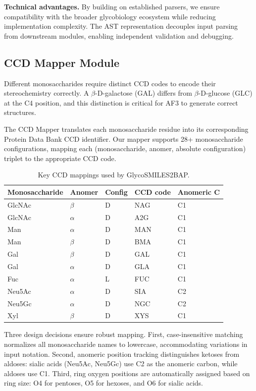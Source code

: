 \documentclass[11pt,a4paper]{article}
\begin{document}
\textbf{Technical advantages.} By building on established parsers, we ensure compatibility with the broader glycobiology ecosystem while reducing implementation complexity. The AST representation decouples input parsing from downstream modules, enabling independent validation and debugging.

\subsection{CCD Mapper Module}

Different monosaccharides require distinct CCD codes to encode their stereochemistry correctly. A $\beta$-D-galactose (GAL) differs from $\beta$-D-glucose (GLC) at the C4 position, and this distinction is critical for AF3 to generate correct structures.

The CCD Mapper translates each monosaccharide residue into its corresponding Protein Data Bank CCD identifier. Our mapper supports 28+ monosaccharide configurations, mapping each (monosaccharide, anomer, absolute configuration) triplet to the appropriate CCD code.

\begin{table}[htbp]
\centering
\caption{Key CCD mappings used by GlycoSMILES2BAP.}
\begin{tabular}{lllll}
\toprule
Monosaccharide & Anomer & Config & CCD code & Anomeric C \\
\midrule
GlcNAc & $\beta$ & D & NAG & C1 \\
GlcNAc & $\alpha$ & D & A2G & C1 \\
Man & $\alpha$ & D & MAN & C1 \\
Man & $\beta$ & D & BMA & C1 \\
Gal & $\beta$ & D & GAL & C1 \\
Gal & $\alpha$ & D & GLA & C1 \\
Fuc & $\alpha$ & L & FUC & C1 \\
Neu5Ac & $\alpha$ & D & SIA & C2 \\
Neu5Gc & $\alpha$ & D & NGC & C2 \\
Xyl & $\beta$ & D & XYS & C1 \\
\bottomrule
\end{tabular}
\end{table}

Three design decisions ensure robust mapping. First, case-insensitive matching normalizes all monosaccharide names to lowercase, accommodating variations in input notation. Second, anomeric position tracking distinguishes ketoses from aldoses: sialic acids (Neu5Ac, Neu5Gc) use C2 as the anomeric carbon, while aldoses use C1. Third, ring oxygen positions are automatically assigned based on ring size: O4 for pentoses, O5 for hexoses, and O6 for sialic acids.
\end{document}

